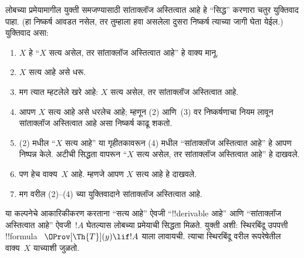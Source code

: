 \documentclass[../../../include/open-logic-section]{subfiles}
\begin{document}
\begin{explain}
लोबच्या प्रमेयामागील
युक्ती समजण्यासाठी
सांताक्लॉज अस्तित्वात
आहे हे “सिद्ध”
करणारा चतुर युक्तिवाद
पाहा. (हा निष्कर्ष
आवडत नसेल, तर
तुम्हाला हवा असलेला
दुसरा निष्कर्ष
त्याच्या जागी
घेता येईल.)
युक्तिवाद असा:
\begin{enumerate}
\item $X$ हे “$X$
  सत्य असेल, तर
  सांताक्लॉज
  अस्तित्वात आहे”
  हे वाक्य मानू.
\item $X$ सत्य आहे
  असे धरू.
\item मग त्यात
  म्हटलेले खरे आहे:
  $X$ सत्य असेल,
  तर सांताक्लॉज
  अस्तित्वात आहे.
\item आपण $X$ सत्य
  आहे असे धरलेच
  आहे; म्हणून
  (2) आणि~(3)
  वर निष्कर्षणाचा
  नियम लावून
  सांताक्लॉज
  अस्तित्वात आहे
  असा निष्कर्ष
  काढू शकतो.
\item (2) मधील
  “$X$ सत्य आहे”
  या गृहीतकावरून
  (4) मधील
  “सांताक्लॉज
  अस्तित्वात आहे”
  हे आपण निष्पन्न
  केले. अटीची
  सिद्धता वापरून
  “$X$ सत्य असेल,
  तर सांताक्लॉज
  अस्तित्वात आहे”
  हे दाखवले.
\item पण हेच
  वाक्य~$X$ आहे.
  म्हणजे आपण
  $X$ सत्य आहे
  हे दाखवले.
\item मग वरील
  (2)--(4) च्या
  युक्तिवादाने
  सांताक्लॉज
  अस्तित्वात आहे.
\end{enumerate}
या कल्पनेचे
आकारिकीकरण करताना
“सत्य आहे” ऐवजी
“!!{derivable} आहे”
आणि “सांताक्लॉज
अस्तित्वात आहे”
ऐवजी~$!A$
घेतल्यास लोबच्या
प्रमेयाची सिद्धता
मिळते. युक्ती अशी:
स्थिरबिंदू उपपत्ती
!!{formula}~
$\OProv[\Th{T}](y) \lif !A$
याला लावायची.
त्याचा स्थिरबिंदू
वरील रूपरेषेतील
वाक्य~$X$
याच्याशी जुळतो.
\end{explain}
\end{document}
